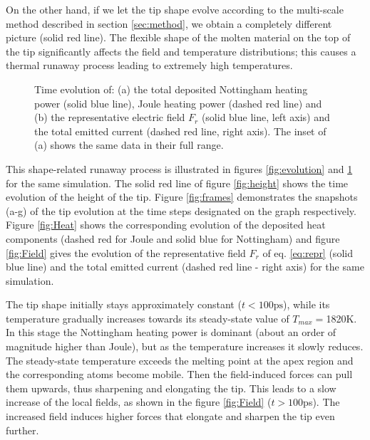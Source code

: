 \documentclass[%
 aps,
 prb,%
 amsmath,amssymb,
reprint,%
superscriptaddress,
]{revtex4-1}
\begin{document}
On the other hand, if we let the tip shape evolve according to the multi-scale method described in section \ref{sec:method}, we obtain a completely different picture (solid red line). The flexible shape of the molten material on the top of the tip significantly affects the field and temperature distributions; this causes a thermal runaway process leading to extremely high temperatures.

\begin{figure}[h]
	\centering


	\caption{\label{fig:hfc} Time evolution of: (a) the total deposited Nottingham heating power (solid blue line), Joule heating power (dashed red line) and (b) the representative electric field $F_r$ (solid blue line, left axis) and the total emitted current (dashed red line, right axis). The inset of (a) shows the same data in their full range.}
\end{figure}

This shape-related runaway process is illustrated in figures \ref{fig:evolution} and \ref{fig:hfc} for the same simulation. The solid red line of figure \ref{fig:height} shows the time evolution of the height of the tip. Figure \ref{fig:frames} demonstrates the snapshots (a-g) of the tip evolution at the time steps designated on the graph respectively. Figure \ref{fig:Heat} shows the corresponding evolution of the deposited heat components (dashed red for Joule and solid blue for Nottingham) and figure \ref{fig:Field} gives the evolution of the representative field $F_r$ of eq. \eqref{eq:repr} (solid blue line) and the total emitted current (dashed red line - right axis) for the same simulation.

The tip shape initially stays approximately constant ($t<100 \textrm{ps}$), while its temperature gradually increases towards its steady-state value of $T_{max} = $1820K. 
In this stage the Nottingham heating power is dominant (about an order of magnitude higher than Joule), but as the temperature increases it slowly reduces.
The steady-state temperature exceeds the melting point at the apex region and the corresponding atoms become mobile. 
Then the field-induced forces can pull them upwards, thus sharpening and elongating the tip.
This leads to a slow increase of the local fields, as shown in the figure \ref{fig:Field} ($t > 100$ps). 
The increased field induces higher forces that elongate and sharpen the tip even further. 
\end{document}
